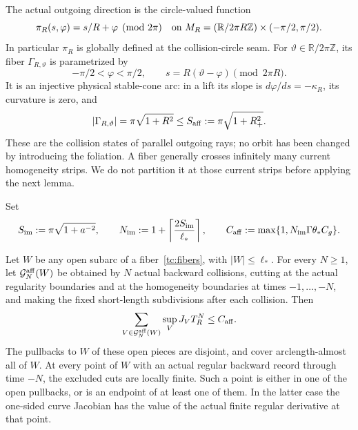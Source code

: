 The actual outgoing direction is the circle-valued function
\begin{equation}\label{tc:direction}
 \pi_R(s,\varphi)=s/R+\varphi\pmod {2\pi}
       \quad\hbox{on }M_R=(\mathbb R/2\pi R\mathbb Z)
                                      \times(-\pi/2,\pi/2).
\end{equation}
In particular $\pi_R$ is globally defined at the collision-circle
seam.  For $\vartheta\in\mathbb R/2\pi\mathbb Z$, its fiber
$\Gamma_{R,\vartheta}$ is parametrized by
\begin{equation}\label{tc:fibers}
 -\pi/2<\varphi<\pi/2,\qquad
 s=R(\vartheta-\varphi)\pmod {2\pi R}.
\end{equation}
It is an injective physical stable-cone arc: in a lift its slope is
$d\varphi/ds=-\kappa_R$, its curvature is zero, and
\begin{equation}\label{tc:fiber-length}
 |\Gamma_{R,\vartheta}|=\pi\sqrt{1+R^2}
      \le S_{\rm aff}:=\pi\sqrt{1+R_+^2}.
\end{equation}
These are the collision states of parallel outgoing rays; no orbit
has been changed by introducing the foliation.  A fiber generally
crosses infinitely many current homogeneity strips.  We do not
partition it at those current strips before applying the next lemma.

Set
\begin{equation}\label{tc:affine-constants}
 S_{\rm im}:=\pi\sqrt{1+a^{-2}},\qquad
 N_{\rm im}:=1+\left\lceil {2S_{\rm im}\over\ell_*}\right\rceil,
 \qquad
 C_{\rm aff}:=\max\{1,N_{\rm im}\Gamma\theta_*C_g\}.
\end{equation}

\begin{lemma}
\label{tc:affine-growth}
Let $W$ be any open subarc of a fiber~\eqref{tc:fibers}, with
$|W|\le\ell_*$.  For every $N\ge1$, let
$\mathcal G_N^{\rm aff}(W)$ be obtained by $N$ actual backward
collisions, cutting at the actual regularity boundaries and at the
homogeneity boundaries at times $-1,\ldots,-N$, and making the fixed
short-length subdivisions after each collision.  Then
\begin{equation}\label{tc:affine-growth-bound}
 \sum_{V\in\mathcal G_N^{\rm aff}(W)}
                  \sup_V J_VT_R^N\le C_{\rm aff}.
\end{equation}
The pullbacks to $W$ of these open pieces are disjoint, and cover
arclength-almost all of $W$.  At every point of $W$ with an actual
regular backward record through time $-N$, the excluded cuts are
locally finite.  Such a point is either in one of the open pullbacks,
or is an endpoint of at least one of them.  In the latter case the
one-sided curve Jacobian has the value of the actual finite regular
derivative at that point.
\end{lemma}

